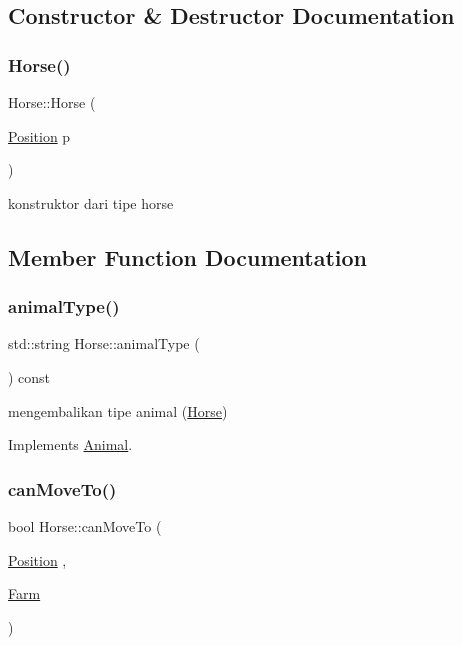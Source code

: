 \subsection{Constructor \& Destructor Documentation}
\mbox{\label{class_horse_a83786e807b66b375f2db7870c6079989}} 
\subsubsection{\texorpdfstring{Horse()}{Horse()}}
{\footnotesize\ttfamily Horse\+::\+Horse (\begin{DoxyParamCaption}\item[{\mbox{\hyperlink{class_position}{Position}}}]{p }\end{DoxyParamCaption})}

konstruktor dari tipe horse 

\subsection{Member Function Documentation}
\mbox{\label{class_horse_a88104166c335f9a2c389968ab792037b}} 
\subsubsection{\texorpdfstring{animalType()}{animalType()}}
{\footnotesize\ttfamily std\+::string Horse\+::animal\+Type (\begin{DoxyParamCaption}{ }\end{DoxyParamCaption}) const\hspace{0.3cm}{\ttfamily [virtual]}}

mengembalikan tipe animal (\mbox{\hyperlink{class_horse}{Horse}}) 

Implements \mbox{\hyperlink{class_animal_a1969cf8cf77a7900207420ae26f856e9}{Animal}}.

\mbox{\label{class_horse_a4ceaa6057607c0394fe1494dedbdd77f}} 
\subsubsection{\texorpdfstring{canMoveTo()}{canMoveTo()}}
{\footnotesize\ttfamily bool Horse\+::can\+Move\+To (\begin{DoxyParamCaption}\item[{\mbox{\hyperlink{class_position}{Position}}}]{,  }\item[{\mbox{\hyperlink{class_farm}{Farm}}}]{ }\end{DoxyParamCaption})}

